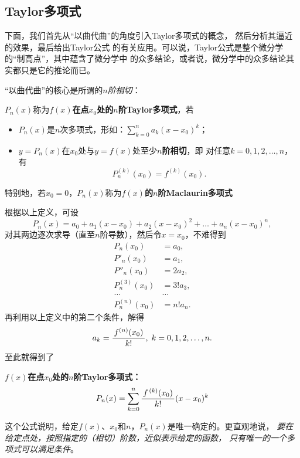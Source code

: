 \subsection{Taylor多项式}
下面，我们首先从“以曲代曲”的角度引入Taylor多项式的概念，
然后分析其逼近的效果，最后给出Taylor公式
的有关应用。可以说，Taylor公式是整个微分学的“制高点”，其中蕴含了微分学中
的众多结论，或者说，微分学中的众多结论其实都只是它的推论而已。

“以曲代曲”的核心是所谓的{\it $n$阶相切}：

\begin{thx}
	$P_n(x)$称为{\bf $f(x)$在点$x_0$处的$n$阶Taylor多项式}，若
	\begin{itemize}
	  \item $P_n(x)$是$n$次多项式，形如：$\sum\limits_{k=0}^na_k(x-x_0)^k$；
	  \item $y=P_n(x)$在$x_0$处与$y=f(x)$处至少{\bf $n$阶相切}，即
	  对任意$k=0,1,2,\ldots,n$，有
	  $$P^{(k)}_n(x_0)=f^{(k)}(x_0).$$
	\end{itemize}
	特别地，若$x_0=0$，$P_n(x)$称为{\bf $f(x)$的$n$阶Maclaurin多项式}
\end{thx}

根据以上定义，可设
$$P_n(x)=a_0+a_1(x-x_0)+a_2(x-x_0)^2+\ldots+a_n(x-x_0)^n,$$
对其两边逐次求导（直至$n$阶导数），然后令$x=x_0$，不难得到
\begin{align*}
	P_n(x_0)&=a_0,\\
	P'_n(x_0)&=a_1,\\
	P''_n(x_0)&=2a_2,\\
	P^{(3)}_n(x_0)&=3!a_3,\\
	\ldots&\ldots\\
	P^{(n)}_n(x_0)&=n!a_n.
\end{align*}
再利用以上定义中的第二个条件，解得
$$a_k=\displaystyle\frac{\,{f^{(n)}(x_0)}\,}{\,{k!}\,},\;k=0,1,2,\ldots,n.$$
至此就得到了
\begin{thx}
	{\bf $f(x)$在点$x_0$处的$n$阶Taylor多项式：}
	$$P_n(x)=\sum\limits_{k=0}^n\displaystyle\frac{\,{f^{\,(k)}(x_0)}\,}{\,{k!}\,}(x-x_0)^k$$
\end{thx}
这个公式说明，给定$f(x)$、$x_0$和$n$，$P_n(x)$是唯一确定的。更直观地说，
{\it 要在给定点处，按照指定的（相切）阶数，近似表示给定的函数，
只有唯一的一个多项式可以满足条件}。

